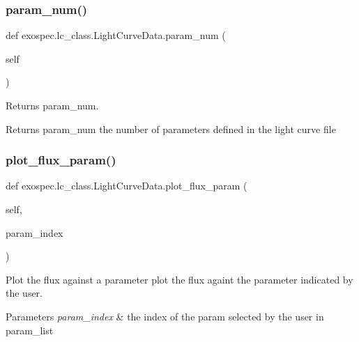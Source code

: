\subsubsection{\texorpdfstring{param\+\_\+num()}{param\_num()}}
{\footnotesize\ttfamily def exospec.\+lc\+\_\+class.\+Light\+Curve\+Data.\+param\+\_\+num (\begin{DoxyParamCaption}\item[{}]{self }\end{DoxyParamCaption})}



Returns param\+\_\+num. 

\begin{DoxyReturn}{Returns}
param\+\_\+num the number of parameters defined in the light curve file 
\end{DoxyReturn}
\mbox{\label{classexospec_1_1lc__class_1_1_light_curve_data_a917ef7c0956874d2c9c1696c02305ef5}} 
\subsubsection{\texorpdfstring{plot\+\_\+flux\+\_\+param()}{plot\_flux\_param()}}
{\footnotesize\ttfamily def exospec.\+lc\+\_\+class.\+Light\+Curve\+Data.\+plot\+\_\+flux\+\_\+param (\begin{DoxyParamCaption}\item[{}]{self,  }\item[{}]{param\+\_\+index }\end{DoxyParamCaption})}



Plot the flux against a parameter plot the flux againt the parameter indicated by the user. 


\begin{DoxyParams}{Parameters}
{\em param\+\_\+index} & the index of the param selected by the user in param\+\_\+list \\
\hline
\end{DoxyParams}
\mbox{\label{classexospec_1_1lc__class_1_1_light_curve_data_a3e63540e9bb38ce3415d27527e8c6ba9}} 
